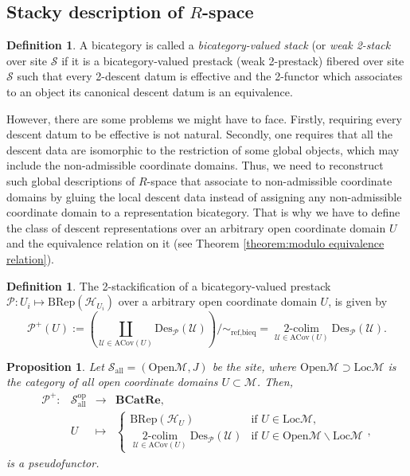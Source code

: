 \documentclass[reqno]{amsart}
\newtheorem{proposition}[formula]{Proposition}
\theoremstyle{definition}
\newtheorem{definition}[formula]{Definition}
\theoremstyle{remark}
\begin{document}
\subsection{Stacky description of $R$-space}
\begin{definition}
    A bicategory is called a \textit{bicategory-valued stack} (or \textit{weak 2-stack} over site $\mathscr{S}$ if it is a bicategory-valued prestack (weak 2-prestack) fibered over site $\mathscr{S}$ such that every 2-descent datum is effective and the 2-functor which associates to an object its canonical descent datum is an equivalence.
\end{definition}
However, there are some problems we might have to face. Firstly, requiring every descent datum to be effective is not natural. Secondly, one requires that all the descent data are isomorphic to the restriction of some global objects, which may include the non-admissible coordinate domains. Thus, we need to reconstruct such global descriptions of $R$-space that associate to non-admissible coordinate domains by gluing the local descent data instead of assigning any non-admissible coordinate domain to a representation bicategory. That is why we have to define the class of descent representations over an arbitrary open coordinate domain $U$ and the equivalence relation on it (see Theorem \ref{theorem:modulo equivalence relation}). 
\begin{definition}
    The 2-stackification of a bicategory-valued prestack $\mathscr{P}:U_i\mapsto \text{BRep}(\mathscr{H}_{U_i})$ over a arbitrary open coordinate domain $U$, is given by
    \begin{equation}
        \mathscr{P}^+(U) := \left( \coprod\limits_{\mathcal{U}\in\text{ACov}(U)} {\text{Des}_\mathscr{P}(\mathcal{U})} \right)\bigg/\sim_{\text{ref,bieq}} = \mathop{2\text{-colim}}\limits_{\mathcal{U}\in\text{ACov}(U)}{\text{Des}_\mathscr{P}(\mathcal{U})}.
    \end{equation}
\end{definition}
\begin{proposition}
    Let $\mathscr{S}_{\text{all}}=(\text{Open}\mathcal{M},J)$ be the site, where $\text{Open}\mathcal{M} \supset \text{Loc}\mathcal{M}$ is the category of all open coordinate domains $U \subset \mathcal{M}$. Then,
    \begin{equation}
        \begin{array}{rccl}
\mathscr{P}^+: & \mathscr{S}_{\text{all}}^{\text{op}}& \longrightarrow & \textbf{BCatRe}, \\
 & U & \longmapsto  & \left\{\begin{array}{cl}
      \text{BRep}(\mathscr{H}_U)&\text{if } U \in \text{Loc}\mathcal{M},  \\
      \mathop{2\text{-colim}}\limits_{\mathcal{U}\in\text{ACov}(U)}{\text{Des}_\mathscr{P}(\mathcal{U})}&\text{if } U \in \text{Open}\mathcal{M}\backslash\text{Loc}\mathcal{M}
 \end{array}\right.,
\end{array}
    \end{equation}
    is a pseudofunctor.
\end{proposition}
\end{document}
